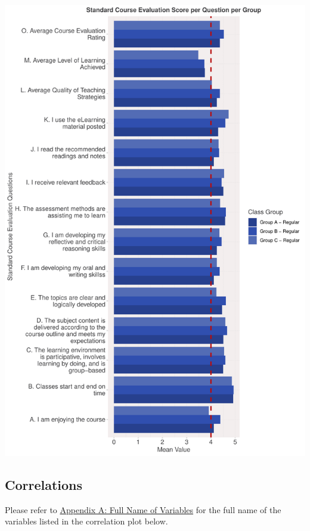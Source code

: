 \documentclass[
]{article}
\begin{document}
\newpage

\includegraphics{Mid-SemesterCourseEvaluation-20240819-20241125-ADB-BBIT2.2_files/figure-latex/VisualizationsForCourseEvaluationResultsperGroup-1.pdf}

\newpage

\subsection{Correlations}\label{correlations}

Please refer to \hyperref[appendix-a-full-name-of-variables]{Appendix A:
Full Name of Variables} for the full name of the variables listed in the
correlation plot below.
\end{document}
